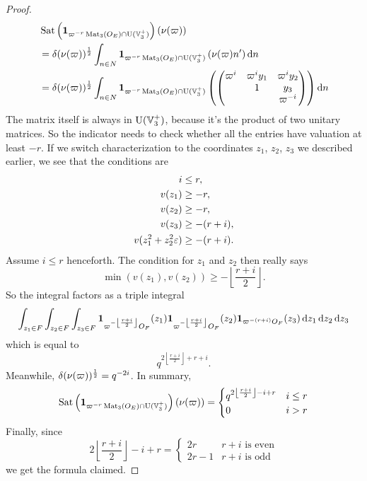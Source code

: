 \begin{proof}
\begin{align*}
    &\Sat\left( \mathbf{1}_{\varpi^{-r} \Mat_3(\OO_E) \cap \U(\VV_3^+)}\right)
      \left( \nu(\varpi)  \right) \\
    &= \delta(\nu(\varpi))^\half \int_{n \in N}
      \mathbf{1}_{\varpi^{-r} \Mat_3(\OO_E) \cap \U(\VV_3^+)}
      \left( \nu(\varpi) n' \right) \odif n \\
    &= \delta(\nu(\varpi))^\half \int_{n \in N}
      \mathbf{1}_{{\varpi^{-r}} \Mat_3(\OO_E) \cap \U(\VV_3^+)}
      \left( \begin{pmatrix} \varpi^i & \varpi^i y_1 & \varpi^i y_2 \\
               & 1 & y_3 \\
               & & \varpi^{-i} \end{pmatrix} \right) \odif n
  \end{align*}
  The matrix itself is always in $\operatorname{U}(\mathbb V_3^+)$, because it's the product of two unitary matrices.
  So the indicator needs to check whether all the entries have valuation at least $-r$.
  If we switch characterization to the coordinates $z_1$, $z_2$, $z_3$ we described earlier,
  we see that the conditions are
  \begin{align*}
    i &\le r, \\
    v(z_1) &\ge -r, \\
    v(z_2) &\ge -r,\\
    v(z_3) &\ge -(r+i),\\
    v(z_1^2 + z_2^2 \varepsilon) &\ge -(r+i).
  \end{align*}
  Assume $i \le r$ henceforth.
  The condition for $z_1$ and $z_2$ then really says
  \[ \min(v(z_1), v(z_2)) \ge -\left\lfloor \frac{r+i}{2} \right\rfloor. \]
  So the integral factors as a triple integral
  \[
    \int_{z_1 \in F}
    \int_{z_2 \in F}
    \int_{z_3 \in F}
    \mathbf{1}_{\varpi^{-\left\lfloor \frac{r+i}{2} \right\rfloor} \OO_F}(z_1)
    \mathbf{1}_{\varpi^{-\left\lfloor \frac{r+i}{2} \right\rfloor} \OO_F}(z_2)
    \mathbf{1}_{\varpi^{-(r+i)} \OO_F}(z_3)
    \odif{z_1,z_2,z_3}
  \]
  which is equal to
  \[ q^{2\left\lfloor \frac{r+i}{2} \right\rfloor+r+i}. \]
  Meanwhile, $\delta(\nu(\varpi))^{\frac{1}{2}} = q^{-2i}$.
  In summary,
  \[
    \operatorname{Sat}\left( \mathbf{1}_{\varpi^{-r} \operatorname{Mat}_3(O_E) \cap \operatorname{U}(\mathbb V_3^+)}\right) \left( \nu(\varpi) \right)
    =
    \begin{cases}
      q^{2\left\lfloor \frac{r+i}{2} \right\rfloor - i + r} & i \le r \\
      0 & i > r
    \end{cases}
  \]
  Finally, since
  \[ 2\left\lfloor \frac{r+i}{2} \right\rfloor - i + r
    = \begin{cases}
      2r & r+i \text{ is even} \\
      2r-1 & r+i \text{ is odd}
    \end{cases}
  \]
  we get the formula claimed.
\end{proof}

